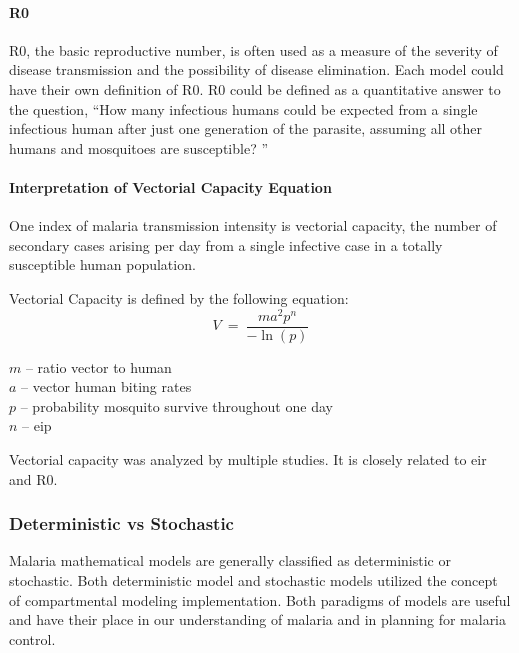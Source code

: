 \documentclass[a4paper, 12pt, twoside]{article}
\begin{document}
\paragraph{\texorpdfstring{\gls{R0}}{R0}}%
\label{par:R0}
\gls{R0}, the basic reproductive number, is often used as a measure of the severity of disease transmission and the possibility of disease elimination.
Each model could have their own definition of \gls{R0}.
\gls{R0} could be defined as a quantitative answer to the question, “How many infectious humans could be expected from a single infectious human after just one generation of the parasite, assuming all other humans and mosquitoes are susceptible? ”

\paragraph{Interpretation of Vectorial Capacity Equation}%
\label{par:interpretation_of_vectorial_capacity_equation}

One index of malaria transmission intensity is vectorial capacity, the number of secondary cases arising per day from a single infective case in a totally susceptible human population.

Vectorial Capacity is defined by the following equation:
\begin{equation}
 V\ =\ \frac{ma^2p^n}{-\ln{\left(p\right)}} 
\end{equation}

\begin{centering}
$m$ – ratio vector to human\\
$a$ – vector human biting rates\\
$p$	– probability mosquito survive throughout one day\\
$n$	–	\gls{eip}
\end{centering}

Vectorial capacity was analyzed by multiple studies\cite{LeMenach2007a,Bomblies2009b,Briet2019,AnjuViswan2019,Molineaux1978,Gerardin2017,Bomblies2014,Weaver2010a}.
It is closely related to \gls{eir} and \gls{R0}.

\subsubsection{Deterministic vs Stochastic}
\label{subsubsec:deterministic_vs_stochastic}

Malaria mathematical models are generally classified as deterministic or stochastic.
Both deterministic model and stochastic models utilized the concept of compartmental modeling implementation.
Both paradigms of models are useful and have their place in our understanding of malaria and in planning for malaria control.
\end{document}

